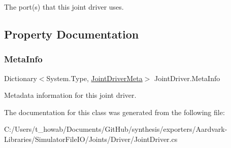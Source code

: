 The port(s) that this joint driver uses. 



\subsection{Property Documentation}
\mbox{\label{class_joint_driver_ac9ee45562c190ff7ac8fdb4a5cedb0ad}} 
\subsubsection{\texorpdfstring{Meta\+Info}{MetaInfo}}
{\footnotesize\ttfamily Dictionary$<$System.\+Type, \hyperlink{class_joint_driver_meta}{Joint\+Driver\+Meta}$>$ Joint\+Driver.\+Meta\+Info\hspace{0.3cm}{\ttfamily [get]}}



Metadata information for this joint driver. 



The documentation for this class was generated from the following file\+:\begin{DoxyCompactItemize}
\item 
C\+:/\+Users/t\+\_\+howab/\+Documents/\+Git\+Hub/synthesis/exporters/\+Aardvark-\/\+Libraries/\+Simulator\+File\+I\+O/\+Joints/\+Driver/Joint\+Driver.\+cs\end{DoxyCompactItemize}
